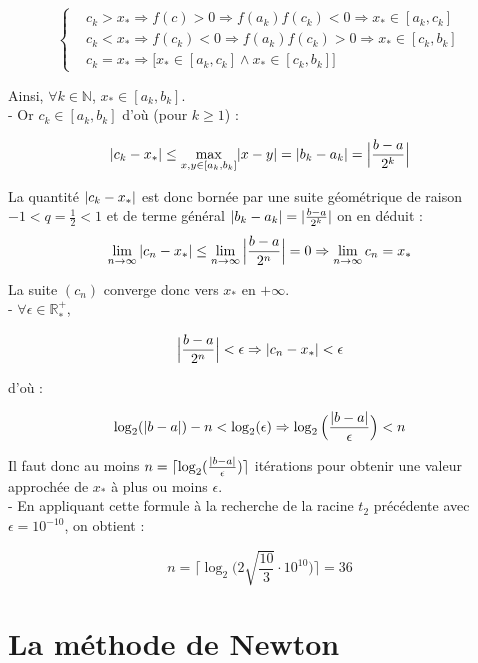 \documentclass{article}
\DeclarePairedDelimiter\abs{\lvert}{\rvert}%
\DeclarePairedDelimiter\bigabs{\Big\lvert}{\Big\rvert}%
\DeclarePairedDelimiter{\ceil}{\lceil}{\rceil}
\begin{document}
\begin{equation*}
    \left \{
    \begin{aligned}
      & c_k > x_* \Rightarrow f(c) > 0 \Rightarrow f(a_k)f(c_k) < 0 \Rightarrow x_* \in [a_k, c_k] \\
      & c_k < x_* \Rightarrow f(c_k) < 0 \Rightarrow f(a_k)f(c_k) > 0 \Rightarrow x_* \in [c_k, b_k] \\
      & c_k = x_* \Rightarrow \bigl[ x_* \in [a_k, c_k] \land x_* \in [c_k, b_k] \bigr]
    \end{aligned} \right.
\end{equation*} 

Ainsi, $\forall k \in \mathbb{N}$, $x_* \in [a_k, b_k]$. \\


- Or $c_{k} \in [a_k, b_k]$ d'où (pour $k \geq 1$) : 

$$\abs{c_k - x_*} \leq \max_{x, y \in [a_k, b_k]} \abs{x - y} = \abs{b_k - a_k} = \bigabs{\frac{b - a}{2^{k}}}$$


La quantité $\abs{c_k - x_*}$ est donc bornée par une suite géométrique de raison $-1 < q = \frac{1}{2} < 1$
et de terme général $\abs{b_k - a_k} = \abs{\frac{b - a}{2^k}}$
on en déduit : $$\lim_{n \to \infty}{\abs{c_n - x_*}} \leq \lim_{n \to \infty}{\bigabs{\frac{b - a}{2^{n}}}} = 0 
\Rightarrow \lim_{n \to \infty}{c_n} = x_*$$

La suite $(c_n)$ converge donc vers $x_*$ en $+\infty$. \\

- $\forall \epsilon \in \mathbb{R}^{+}_{*}$, 

$$\bigabs{\frac{b - a}{2^{n}}} < \epsilon \Rightarrow \abs{c_n - x_*} < \epsilon$$

d'où :

$$\log_{2}(\abs{b - a}) - n < \log_{2}(\epsilon) \Rightarrow \log_{2}\Big(\frac{\abs{b - a}}{\epsilon}\Big) < n$$

Il faut donc au moins $n = \ceil{\log_{2}(\frac{\abs{b - a}}{\epsilon})}$ itérations pour
obtenir une valeur approchée de $x_*$ à plus ou moins $\epsilon$. \\

- En appliquant cette formule à la recherche de la racine $t_2$ précédente avec $\epsilon = 10^{-10}$, on obtient :

$$n = \Big\lceil{\log_{2}\Big({2\sqrt{\frac{10}{3}}} \cdot 10^{10}\Big)}\Big\rceil = 36$$

\newpage

\section{La méthode de Newton}
\end{document}
